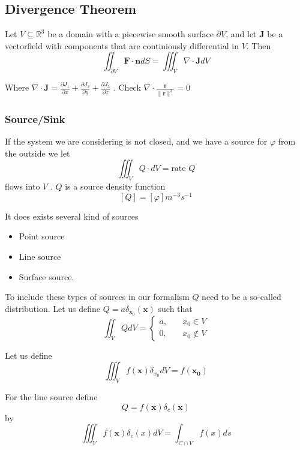 \documentclass{article}
\theoremstyle{remark}
\begin{document}
\subsection{Divergence Theorem}%
\label{sub:divergence_theorem}

Let $V \subseteq  \mathbb{R} ^3  $ be a domain with a piecewise smooth surface $\partial  V$, and let $\mathbf{J}$ be a vectorfield with components that are continiously differential in $V$. Then \[
\iint_{\partial V}^{}  \mathbf{F} \cdot  \mathbf{n} dS   = \iiint_{V}^{} \nabla \cdot \mathbf{J} dV    
\] 

Where $\displaystyle \nabla \cdot \mathbf{J} = \frac{\partial J_{1}}{\partial x}  + \frac{\partial J_{2}}{\partial y}  + \frac{\partial J_{3}}{\partial z} $ . Check $ \displaystyle  \nabla \cdot  \frac{\mathbf{r}}{\|\mathbf{r}\|_{}^{3}} = 0 $ 


\subsubsection{Source/Sink}%
\label{ssub:source_sink}

If the system we are considering is not closed, and we have a source for $\varphi $ from the outside we let \[
\iiint_{V}^{} Q \cdot dV = \text{rate }  Q
\] 
flows into $V$ . $Q$ is a source density function \[
\left[Q \right] = \left[ \varphi  \right] m^{-3} s^{-1}
\] 

It does exists several kind of sources 
\begin{itemize}
  \item Point source 
  \item Line source 
  \item Surface source.
\end{itemize}

To include these types of sources in our formalism $Q$ need to be a so-called distribution. Let us define $\displaystyle  Q = a \delta _{\mathbf{x}_{0}} \left( \mathbf{x} \right)$ such that \[
\iint_{V}^{}  Q dV = \begin{cases}
  a ,   &  \quad x _{0} \in V \\
  0,  &  \quad x_{0} \not\in V  
\end{cases} 
\] 

Let us define \[
\iiint_{V}^{}  f\left( \mathbf{x} \right) \delta _{x_{0}}  dV = f\left( \mathbf{x_{0}} \right)
\] 

For the line source define  \[
Q = f\left( \mathbf{x} \right) \delta _{c}\left( \mathbf{x} \right)
\] 
by \[
\iiint_{V}^{}  f\left( \mathbf{x} \right) \delta _{c} \left( x \right) dV = \int_{C \cap V  }^{}  f\left( x \right) ds  
\] 
\end{document}
